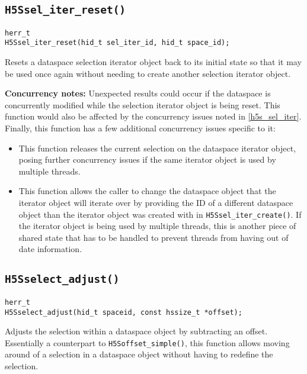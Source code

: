 \documentclass[../HDF5_RFC.tex]{subfiles}
\begin{document}
\subsection{\texttt{H5Ssel\_iter\_reset()}}
\label{apdx:h5s_func_h5ssel_iter_reset}

\begin{verbatim}
herr_t
H5Ssel_iter_reset(hid_t sel_iter_id, hid_t space_id);
\end{verbatim}

Resets a dataspace selection iterator object back to its initial state so that it may be
used once again without needing to create another selection iterator object.

\textbf{Concurrency notes:} Unexpected results could occur if the dataspace is concurrently
modified while the selection iterator object is being reset. This function would also be
affected by the concurrency issues noted in \ref{h5s_sel_iter}. Finally, this function has a
few additional concurrency issues specific to it:

\begin{itemize}
    \item This function releases the current selection on the dataspace iterator object, posing
          further concurrency issues if the same iterator object is used by multiple threads.
    \item This function allows the caller to change the dataspace object that the iterator object
          will iterate over by providing the ID of a different dataspace object than the iterator
          object was created with in \texttt{H5Ssel\_iter\_create()}. If the iterator object is
          being used by multiple threads, this is another piece of shared state that has to be
          handled to prevent threads from having out of date information.
\end{itemize}

\subsection{\texttt{H5Sselect\_adjust()}}
\label{apdx:h5s_func_h5sselect_adjust}

\begin{verbatim}
herr_t
H5Sselect_adjust(hid_t spaceid, const hssize_t *offset);
\end{verbatim}

Adjusts the selection within a dataspace object by subtracting an offset. Essentially a counterpart
to \texttt{H5Soffset\_simple()}, this function allows moving around of a selection in a dataspace
object without having to redefine the selection.
\end{document}
